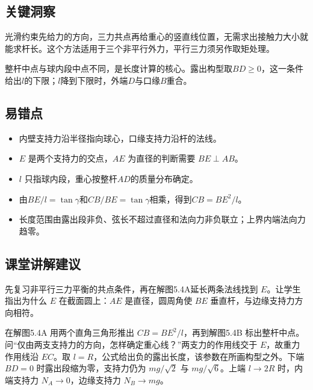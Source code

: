\documentclass[UTF8,fontset=fandol,a4paper,11pt]{ctexart}
\begin{document}

\subsection*{关键洞察}

光滑约束先给力的方向，三力共点再给重心的竖直线位置，无需求出接触力大小就能求杆长。这个方法适用于三个非平行外力，平行三力须另作取矩处理。

整杆中点与球内段中点不同，是长度计算的核心。露出构型取$BD\ge0$，这一条件给出$l$的下限；$l$降到下限时，外端$D$与口缘$B$重合。



\subsection*{易错点}

\begin{itemize}\item 内壁支持力沿半径指向球心，口缘支持力沿杆的法线。\item $E$ 是两个支持力的交点，$AE$ 为直径的判断需要 $BE\perp AB$。\item $l$ 只指球内段，重心按整杆$AD$的质量分布确定。\item 由$BE/l=\tan\gamma$和$CB/BE=\tan\gamma$相乘，得到$CB=BE^2/l$。\item 长度范围由露出段非负、弦长不超过直径和法向力非负联立；上界内端法向力趋零。\end{itemize}



\subsection*{课堂讲解建议}

先复习非平行三力平衡的共点条件，再在解图5.4A延长两条法线找到 $E$。让学生指出为什么 $E$ 在截面圆上：$AE$ 是直径，圆周角使 $BE$ 垂直杆，与边缘支持力方向相符。

在解图5.4A 用两个直角三角形推出 $CB=BE^2/l$，再到解图5.4B 标出整杆中点。问“仅由两支支持力的方向，怎样确定重心线？”两支力的作用线交于 $E$，故重力作用线沿 $EC$。取 $l=R$，公式给出负的露出长度，该参数在所画构型之外。下端 $BD=0$ 时露出段缩为零，支持力仍为 $mg/\sqrt2$ 与 $mg/\sqrt6$。上端 $l\to2R$ 时，内端支持力 $N_A\to0$，边缘支持力 $N_B\to mg$。
\end{document}
